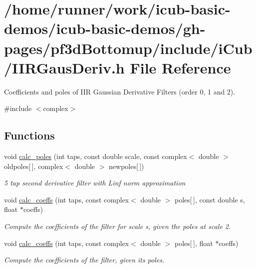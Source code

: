 \section{/home/runner/work/icub-\/basic-\/demos/icub-\/basic-\/demos/gh-\/pages/pf3d\+Bottomup/include/i\+Cub/\+I\+I\+R\+Gaus\+Deriv.h File Reference}
\label{IIRGausDeriv_8h}


Coefficients and poles of I\+IR Gaussian Derivative Filters (order 0, 1 and 2).  


{\ttfamily \#include $<$complex$>$}\newline
\subsection*{Functions}
\begin{DoxyCompactItemize}
\item 
void \hyperlink{IIRGausDeriv_8h_a2741eb625282f8d68ba971a4431407a5}{calc\+\_\+poles} (int taps, const double scale, const complex$<$ double $>$ oldpoles\mbox{[}$\,$\mbox{]}, complex$<$ double $>$ newpoles\mbox{[}$\,$\mbox{]})
\begin{DoxyCompactList}\small\item\em 5 tap second derivative filter with Linf norm approximation \end{DoxyCompactList}\item 
void \hyperlink{IIRGausDeriv_8h_a3e168333285d90a0bfd848d9791ca427}{calc\+\_\+coeffs} (int taps, const complex$<$ double $>$ poles\mbox{[}$\,$\mbox{]}, const double s, float $\ast$coeffs)
\begin{DoxyCompactList}\small\item\em Compute the coefficients of the filter for scale s, given the poles at scale 2. \end{DoxyCompactList}\item 
void \hyperlink{IIRGausDeriv_8h_a3e7f009d38086e228c6ba8b3e5b6055f}{calc\+\_\+coeffs} (int taps, const complex$<$ double $>$ poles\mbox{[}$\,$\mbox{]}, float $\ast$coeffs)
\begin{DoxyCompactList}\small\item\em Compute the coefficients of the filter, given its poles. \end{DoxyCompactList}\end{DoxyCompactItemize}
